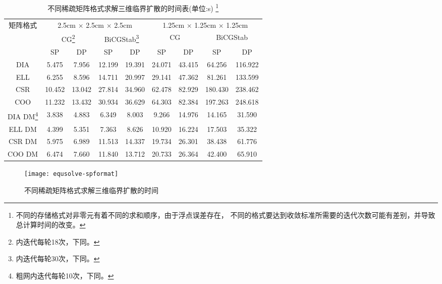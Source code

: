 \begin{table}
\centering
\begin{minipage}{\linewidth}
\centering
\caption[不同稀疏矩阵格式求解三维临界扩散的时间表]
{\label{tab:equsolve.spformat}%
不同稀疏矩阵格式求解三维临界扩散的时间表(单位:s)%
\footnote{不同的存储格式对非零元有着不同的求和顺序，由于浮点误差存在，%
不同的格式要达到收敛标准所需要的迭代次数可能有差别，并导致总计算时间的改变。}
}
\small
\begin{tabular}{ccccccccc}
\toprule
 \multirow {3}{*}{矩阵格式}  &
       \multicolumn{4}{c}{2.5cm $\times$ 2.5cm $\times$ 2.5cm}
       &\multicolumn{4}{c}{1.25cm $\times$ 1.25cm $\times$ 1.25cm} \\
 &\multicolumn{2}{c}{CG\footnote{内迭代每轮18次，下同。}}
 	   &\multicolumn{2}{c}{BiCGStab\footnote{内迭代每轮30次，下同。}}
       & \multicolumn{2}{c}{CG}& \multicolumn{2}{c}{BiCGStab}\\
 & SP& DP& SP& DP& SP& DP& SP& DP\\
\midrule
 DIA&  5.475&  7.956& 12.199& 19.391& 24.071& 43.415&  64.256& 116.922\\
 ELL&  6.255&  8.596& 14.711& 20.997& 29.141& 47.362&  81.261& 133.599\\
 CSR& 10.452& 13.042& 27.814& 34.960& 62.478& 82.929& 180.430& 238.462\\
 COO& 11.232& 13.432& 30.934& 36.629& 64.303& 82.384& 197.263& 248.618\\
 DIA DM\footnote{粗网内迭代每轮10次，下同。}
       &  3.838&  4.883&  6.349&  8.003&  9.266& 14.976&  14.165&  31.590\\
 ELL DM&  4.399&  5.351&  7.363&  8.626& 10.920& 16.224&  17.503&  35.322\\
 CSR DM&  5.975&  6.989& 11.513& 14.337& 19.734& 26.301&  38.438&  61.776\\
 COO DM&  6.474&  7.660& 11.840& 13.712& 20.733& 26.364&  42.400&  65.910\\
\bottomrule
\end{tabular}
\end{minipage}
\end{table}

\begin{figure}
\centering
\texttt{[image: equsolve-spformat]}
\caption{\label{fig:equsolve.spformat}不同稀疏矩阵格式求解三维临界扩散的时间}
\end{figure}


